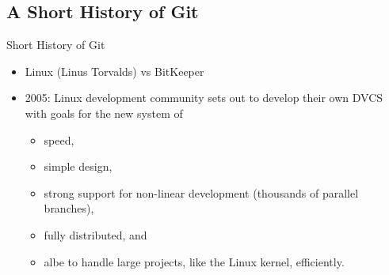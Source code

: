 \subsection{A Short History of Git}
\begin{frame}[t]{Short History of Git}
  \begin{itemize}
    \item Linux (Linus Torvalds) vs BitKeeper
    \item 2005: Linux development community sets out to develop their own DVCS
      with goals for the new system of
      \begin{itemize}
        \item speed,
        \item simple design,
        \item strong support for non-linear development (thousands of parallel
          branches),
        \item fully distributed, and
        \item albe to handle large projects, like the Linux kernel,
          efficiently.
      \end{itemize}
  \end{itemize}
\end{frame}


